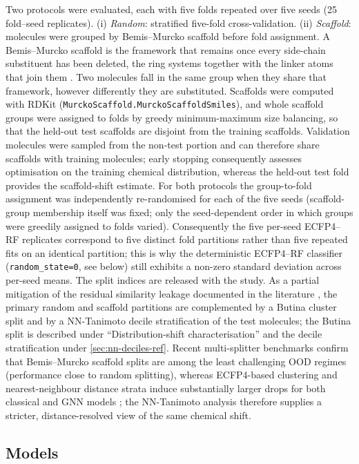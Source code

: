 \documentclass[11pt,a4paper]{article}
\begin{document}
Two protocols were evaluated, each with five folds repeated over five seeds (\num{25} fold--seed replicates). (i) \emph{Random}: stratified five-fold cross-validation. (ii) \emph{Scaffold}: molecules were grouped by Bemis--Murcko scaffold before fold assignment. A Bemis--Murcko scaffold is the framework that remains once every side-chain substituent has been deleted, the ring systems together with the linker atoms that join them \citep{bemis_murcko_1996}. Two molecules fall in the same group when they share that framework, however differently they are substituted. Scaffolds were computed with RDKit (\texttt{MurckoScaffold.MurckoScaffoldSmiles}), and whole scaffold groups were assigned to folds by greedy minimum-maximum size balancing, so that the held-out test scaffolds are disjoint from the training scaffolds. Validation molecules were sampled from the non-test portion and can therefore share scaffolds with training molecules; early stopping consequently assesses optimisation on the training chemical distribution, whereas the held-out test fold provides the scaffold-shift estimate. For both protocols the group-to-fold assignment was independently re-randomised for each of the five seeds (scaffold-group membership itself was fixed; only the seed-dependent order in which groups were greedily assigned to folds varied). Consequently the five per-seed ECFP4--RF replicates correspond to five distinct fold partitions rather than five repeated fits on an identical partition; this is why the deterministic ECFP4--RF classifier (\texttt{random\_state=0}, see below) still exhibits a non-zero standard deviation across per-seed means. The split indices are released with the study. As a partial mitigation of the residual similarity leakage documented in the literature \citep{bash2025umap,fooladi2025ood}, the primary random and scaffold partitions are complemented by a Butina cluster split and by a NN-Tanimoto decile stratification of the test molecules; the Butina split is described under ``Distribution-shift characterisation'' and the decile stratification under \cref{sec:nn-deciles-ref}. Recent multi-splitter benchmarks confirm that Bemis--Murcko scaffold splits are among the least challenging OOD regimes (performance close to random splitting), whereas ECFP4-based clustering and nearest-neighbour distance strata induce substantially larger drops for both classical and GNN models \citep{fooladi2025ood}; the NN-Tanimoto analysis therefore supplies a stricter, distance-resolved view of the same chemical shift.

\subsection{Models}
\end{document}
